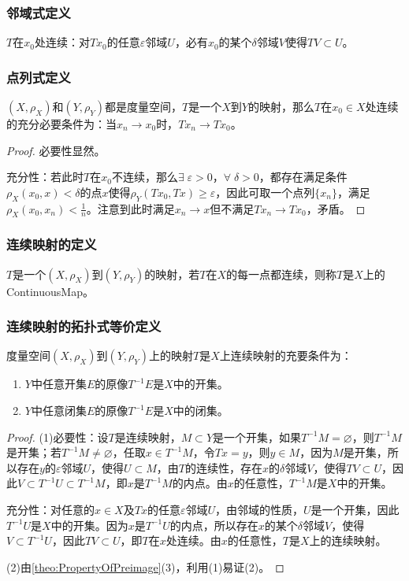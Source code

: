 \subsubsection{邻域式定义}
\begin{definition}
	$T$在$x_0$处连续：对$Tx_0$的任意$\varepsilon$邻域$U$，必有$x_0$的某个$\delta$邻域$V$使得$TV\subset U$。
\end{definition}
\subsubsection{点列式定义}
\begin{theorem}
	$(X,\rho_X)$和$(Y,\rho_Y)$都是度量空间，$T$是一个$X$到$Y$的映射，那么$T$在$x_0\in X$处连续的充分必要条件为：当$x_n\to x_0$时，$Tx_n\to Tx_0$。
\end{theorem}
\begin{proof}
	必要性显然。\par
	充分性：若此时$T$在$x_0$不连续，那么$\exists\;\varepsilon>0$，$\forall\;\delta>0$，都存在满足条件$\rho_X(x_0,x)<\delta$的点$x$使得$\rho_Y(Tx_0,Tx)\geqslant\varepsilon$，因此可取一个点列$\{x_n\}$，满足$\rho_X(x_0,x_n)<\frac{1}{n}$。注意到此时满足$x_n\to x$但不满足$Tx_n\to Tx_0$，矛盾。
\end{proof}
\subsubsection{连续映射的定义}
\begin{definition}
	$T$是一个$(X,\rho_X)$到$(Y,\rho_Y)$的映射，若$T$在$X$的每一点都连续，则称$T$是$X$上的\gls{ContinuousMap}。
\end{definition}
\subsubsection{连续映射的拓扑式等价定义}
\begin{theorem}
	度量空间$(X,\rho_X)$到$(Y,\rho_Y)$上的映射$T$是$X$上连续映射的充要条件为：
	\begin{enumerate}
		\item $Y$中任意开集$E$的原像$T^{-1}E$是$X$中的开集。
		\item $Y$中任意闭集$E$的原像$T^{-1}E$是$X$中的闭集。
	\end{enumerate}
\end{theorem}
\begin{proof}
	(1)必要性：设$T$是连续映射，$M\subset Y$是一个开集，如果$T^{-1}M=\varnothing$，则$T^{-1}M$是开集；若$T^{-1}M\ne\varnothing$，任取$x\in T^{-1}M$，令$Tx=y$，则$y\in M$，因为$M$是开集，所以存在$y$的$\varepsilon$邻域$U$，使得$U\subset M$，由$T$的连续性，存在$x$的$\delta$邻域$V$，使得$TV\subset U$，因此$V\subset T^{-1}U\subset T^{-1}M$，即$x$是$T^{-1}M$的内点。由$x$的任意性，$T^{-1}M$是$X$中的开集。\par
	充分性：对任意的$x\in X$及$Tx$的任意$\varepsilon$邻域$U$，由邻域的性质，$U$是一个开集，因此$T^{-1}U$是$X$中的开集。因为$x$是$T^{-1}U$的内点，所以存在$x$的某个$\delta$邻域$V$，使得$V\subset T^{-1}U$，因此$TV\subset U$，即$T$在$x$处连续。由$x$的任意性，$T$是$X$上的连续映射。\par
	(2)由\cref{theo:PropertyOfPreimage}(3)，利用(1)易证(2)。
\end{proof}
